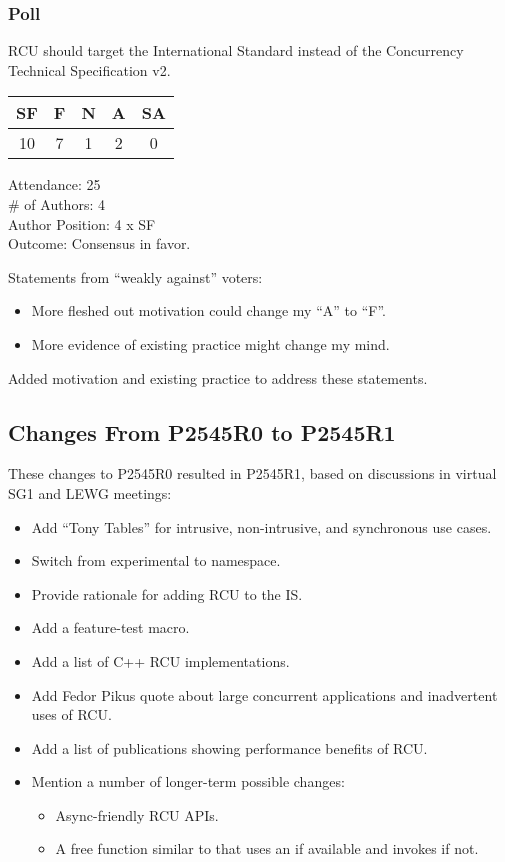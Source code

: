 \subsubsection{Poll}
\label{sec:LEWG-2022-09-20:Poll}

RCU should target the International Standard instead of the Concurrency Technical Specification v2.

\begin{tabular}{c|c|c|c|c}
SF & F &  N & A & SA \\
\hline
10 & 7 &  1 & 2 &  0 \\
\end{tabular}

Attendance: 25 \\
\# of Authors: 4 \\
Author Position: 4 x SF \\
Outcome: Consensus in favor.

Statements from ``weakly against'' voters:

\begin{itemize}
\item	More fleshed out motivation could change my ``A'' to ``F''.
\item	More evidence of existing practice might change my mind.
\end{itemize}

Added motivation and existing practice to address these statements.

\subsection{Changes From P2545R0 to P2545R1}
\label{sec:Changes From P2545R0 to P2545R1}

These changes to P2545R0 resulted in P2545R1, based on discussions
in virtual SG1 and LEWG meetings:

\begin{itemize}
\item	Add ``Tony Tables'' for intrusive, non-intrusive, and
	synchronous use cases.
\item	Switch from experimental to  namespace.
\item	Provide rationale for adding RCU to the IS.
\item	Add a feature-test macro.
\item	Add a list of C++ RCU implementations.
\item	Add Fedor Pikus quote about large concurrent applications
	and inadvertent uses of RCU.
\item	Add a list of publications showing performance benefits of RCU.
\item	Mention a number of longer-term possible changes:
	\begin{itemize}
	\item	Async-friendly RCU APIs.
	\item	A free function similar to  that
		uses an  if available and invokes
		 if not.
	\end{itemize}
\end{itemize}

